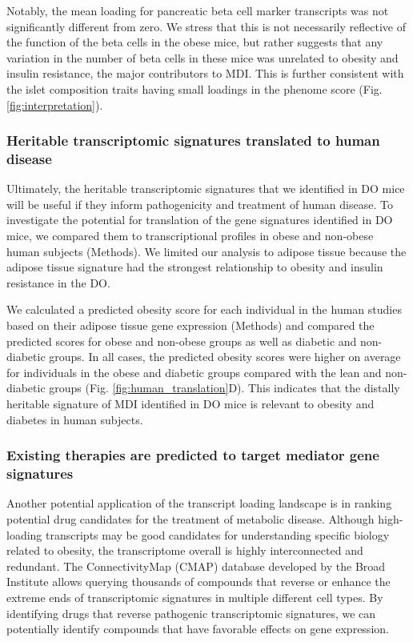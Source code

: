 \documentclass[
]{article}
\begin{document}
Notably, the mean loading for pancreatic beta cell marker transcripts
was not significantly different from zero. We stress that this is not
necessarily reflective of the function of the beta cells in the obese
mice, but rather suggests that any variation in the number of beta cells
in these mice was unrelated to obesity and insulin resistance, the major
contributors to MDI. This is further consistent with the islet
composition traits having small loadings in the phenome score (Fig.
\ref{fig:interpretation}).

\subsubsection{Heritable transcriptomic signatures translated to human
disease}\label{heritable-transcriptomic-signatures-translated-to-human-disease}

Ultimately, the heritable transcriptomic signatures that we identified
in DO mice will be useful if they inform pathogenicity and treatment of
human disease. To investigate the potential for translation of the gene
signatures identified in DO mice, we compared them to transcriptional
profiles in obese and non-obese human subjects (Methods). We limited our
analysis to adipose tissue because the adipose tissue signature had the
strongest relationship to obesity and insulin resistance in the DO.

We calculated a predicted obesity score for each individual in the human
studies based on their adipose tissue gene expression (Methods) and
compared the predicted scores for obese and non-obese groups as well as
diabetic and non-diabetic groups. In all cases, the predicted obesity
scores were higher on average for individuals in the obese and diabetic
groups compared with the lean and non-diabetic groups (Fig.
\ref{fig:human_translation}D). This indicates that the distally
heritable signature of MDI identified in DO mice is relevant to obesity
and diabetes in human subjects.

\subsubsection{Existing therapies are predicted to target mediator gene
signatures}\label{existing-therapies-are-predicted-to-target-mediator-gene-signatures}

Another potential application of the transcript loading landscape is in
ranking potential drug candidates for the treatment of metabolic
disease. Although high-loading transcripts may be good candidates for
understanding specific biology related to obesity, the transcriptome
overall is highly interconnected and redundant. The ConnectivityMap
(CMAP) database \cite{pmid17008526} developed by the Broad Institute
allows querying thousands of compounds that reverse or enhance the
extreme ends of transcriptomic signatures in multiple different cell
types. By identifying drugs that reverse pathogenic transcriptomic
signatures, we can potentially identify compounds that have favorable
effects on gene expression.
\end{document}
